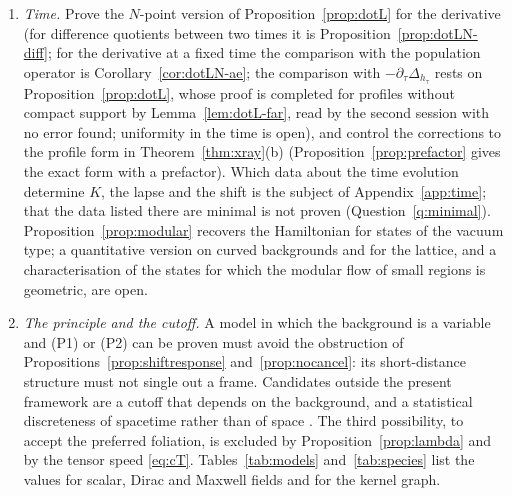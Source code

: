 \documentclass[11pt,a4paper]{article}
\theoremstyle{stmt}
\theoremstyle{defn}
\theoremstyle{rmk}
\numberwithin{equation}{section}
\begin{document}
\begin{enumerate}
\item \emph{Time.} Prove the $N$-point version of Proposition~\ref{prop:dotL} for the derivative (for difference quotients between two times it is Proposition~\ref{prop:dotLN-diff}; for the derivative at a fixed time the comparison with the population operator is Corollary~\ref{cor:dotLN-ae}; the comparison with $-\partial_\tau\Delta_{h_\tau}$ rests on Proposition~\ref{prop:dotL}, whose proof is completed for profiles without compact support by Lemma~\ref{lem:dotL-far}, read by the second session with no error found; uniformity in the time is open), and control the corrections to the profile form in Theorem~\ref{thm:xray}(b) (Proposition~\ref{prop:prefactor} gives the exact form with a prefactor). Which data about the time evolution determine $K$, the lapse and the shift is the subject of Appendix~\ref{app:time}; that the data listed there are minimal is not proven (Question~\ref{q:minimal}). Proposition~\ref{prop:modular} recovers the Hamiltonian for states of the vacuum type; a quantitative version on curved backgrounds and for the lattice, and a characterisation of the states for which the modular flow of small regions is geometric, are open.
\item \emph{The principle and the cutoff.} A model in which the background is a variable and (P1) or (P2) can be proven must avoid the obstruction of Propositions~\ref{prop:shiftresponse} and~\ref{prop:nocancel}: its short-distance structure must not single out a frame. Candidates outside the present framework are a cutoff that depends on the background, and a statistical discreteness of spacetime rather than of space \cite{BHS}. The third possibility, to accept the preferred foliation, is excluded by Proposition~\ref{prop:lambda} and by the tensor speed \eqref{eq:cT}. Tables~\ref{tab:models} and~\ref{tab:species} list the values for scalar, Dirac and Maxwell fields and for the kernel graph. 


\end{enumerate}
\end{document}

